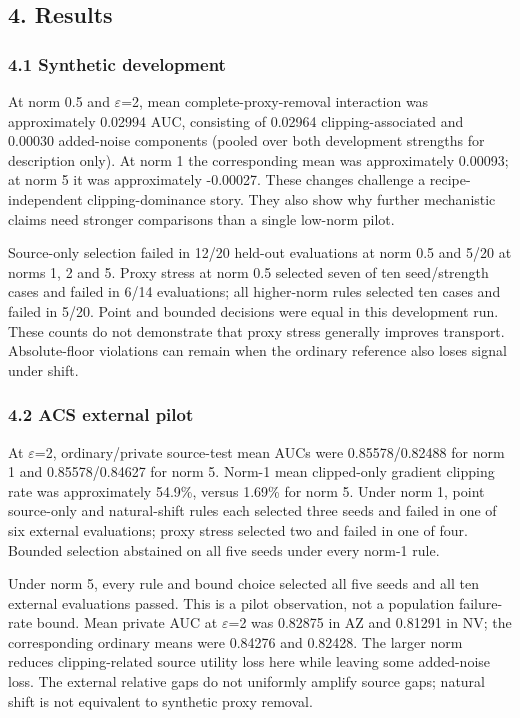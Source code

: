 \documentclass[
  10pt,
]{article}
\begin{document}
\hypertarget{results}{%
\subsection{4. Results}\label{results}}

\hypertarget{synthetic-development}{%
\subsubsection{4.1 Synthetic development}\label{synthetic-development}}

At norm 0.5 and \(\varepsilon\)=2, mean complete-proxy-removal
interaction was approximately 0.02994 AUC, consisting of 0.02964
clipping-associated and 0.00030 added-noise components (pooled over both
development strengths for description only). At norm 1 the corresponding
mean was approximately 0.00093; at norm 5 it was approximately -0.00027.
These changes challenge a recipe-independent clipping-dominance story.
They also show why further mechanistic claims need stronger comparisons
than a single low-norm pilot.

Source-only selection failed in 12/20 held-out evaluations at norm 0.5
and 5/20 at norms 1, 2 and 5. Proxy stress at norm 0.5 selected seven of
ten seed/strength cases and failed in 6/14 evaluations; all higher-norm
rules selected ten cases and failed in 5/20. Point and bounded decisions
were equal in this development run. These counts do not demonstrate that
proxy stress generally improves transport. Absolute-floor violations can
remain when the ordinary reference also loses signal under shift.

\hypertarget{acs-external-pilot}{%
\subsubsection{4.2 ACS external pilot}\label{acs-external-pilot}}

At \(\varepsilon\)=2, ordinary/private source-test mean AUCs were
0.85578/0.82488 for norm 1 and 0.85578/0.84627 for norm 5. Norm-1 mean
clipped-only gradient clipping rate was approximately 54.9\%, versus
1.69\% for norm 5. Under norm 1, point source-only and natural-shift
rules each selected three seeds and failed in one of six external
evaluations; proxy stress selected two and failed in one of four.
Bounded selection abstained on all five seeds under every norm-1 rule.

Under norm 5, every rule and bound choice selected all five seeds and
all ten external evaluations passed. This is a pilot observation, not a
population failure-rate bound. Mean private AUC at \(\varepsilon\)=2 was
0.82875 in AZ and 0.81291 in NV; the corresponding ordinary means were
0.84276 and 0.82428. The larger norm reduces clipping-related source
utility loss here while leaving some added-noise loss. The external
relative gaps do not uniformly amplify source gaps; natural shift is not
equivalent to synthetic proxy removal.
\end{document}

